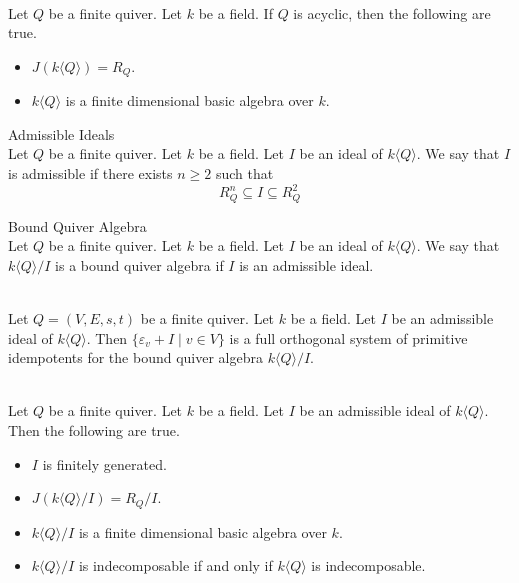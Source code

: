 \documentclass[a4paper]{article}
\begin{document}
\begin{prp}{}{}\\
Let $Q$ be a finite quiver. Let $k$ be a field. If $Q$ is acyclic, then the following are true. 
\begin{itemize}
\item $J(k\langle Q\rangle)=R_Q$. 
\item $k\langle Q\rangle$ is a finite dimensional basic algebra over $k$. 
\end{itemize}
\end{prp}

\begin{defn}{Admissible Ideals}{}\\
Let $Q$ be a finite quiver. Let $k$ be a field. Let $I$ be an ideal of $k\langle Q\rangle$. We say that $I$ is admissible if there exists $n\geq 2$ such that $$R_Q^n\subseteq I\subseteq R_Q^2$$
\end{defn}

\begin{defn}{Bound Quiver Algebra}{}\\
Let $Q$ be a finite quiver. Let $k$ be a field. Let $I$ be an ideal of $k\langle Q\rangle$. We say that $k\langle Q\rangle/I$ is a bound quiver algebra if $I$ is an admissible ideal. 
\end{defn}

\begin{prp}{}{}\\
Let $Q=(V,E,s,t)$ be a finite quiver. Let $k$ be a field. Let $I$ be an admissible ideal of $k\langle Q\rangle$. Then $\{\varepsilon_v+I\;|\;v\in V\}$ is a full orthogonal system of primitive idempotents for the bound quiver algebra $k\langle Q\rangle/I$. 
\end{prp}

\begin{prp}{}{}\\
Let $Q$ be a finite quiver. Let $k$ be a field. Let $I$ be an admissible ideal of $k\langle Q\rangle$. Then the following are true. 
\begin{itemize}
\item $I$ is finitely generated. 
\item $J(k\langle Q\rangle/I)=R_Q/I$. 
\item $k\langle Q\rangle/I$ is a finite dimensional basic algebra over $k$. 
\item $k\langle Q\rangle/I$ is indecomposable if and only if $k\langle Q\rangle$ is indecomposable. 
\end{itemize}
\end{prp}
\end{document}
